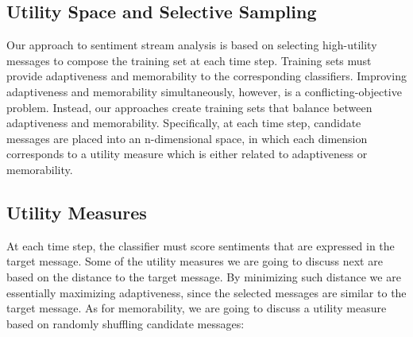 %
%
%

\subsection{Utility Space and Selective Sampling}

Our approach to sentiment stream analysis is based on selecting high-utility messages to compose the training set at each time step. Training sets must provide adaptiveness and memorability to the corresponding classifiers. Improving adaptiveness and memorability simultaneously, however, is a conflicting-objective problem. Instead, our approaches create training sets that balance between adaptiveness and memorability. Specifically, at each time step, candidate messages are placed into an n-dimensional space, in which each dimension corresponds to a utility measure which is either related to adaptiveness or memorability.

\subsection*{Utility Measures}
At each time step, the classifier must score sentiments that are expressed in the target message. Some of the utility measures we are going to discuss next are based on the distance to the target message. By minimizing such distance we are essentially maximizing adaptiveness, since the selected messages are similar to the target message. As for memorability, we are going to discuss a utility measure based on randomly shuffling candidate messages:

